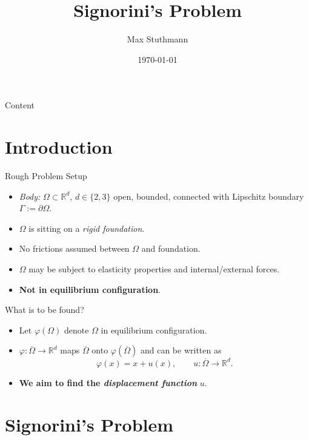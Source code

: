 \documentclass[10pt,aspectratio=169]{beamer}
\title{Signorini's Problem}
\author{Max Stuthmann}
\date{\tiny \today}
\def\R{{\mathbb R}}
\begin{document}
\begin{frame}[plain]
	\titlepage
\end{frame}

\begin{frame}{Content}
	\tableofcontents
\end{frame}

\section{Introduction}
\begin{frame}{Rough Problem Setup}
	\begin{itemize}
		\item {\em Body: } $\Omega\subset\R^d,\, d\in\{2,3\}$ open, bounded, connected with Lipschitz boundary $\Gamma:= \partial\Omega$.
		\item $\Omega$ is sitting on a {\em rigid foundation}.
		\item No frictions assumed between $\Omega$ and foundation.
		\item $\Omega$ may be subject to elasticity properties and internal/external forces.
		\item {\bf Not in equilibrium configuration}.
	\end{itemize}
	\begin{figure}[!h]
		\centering
		
	\end{figure}
\end{frame}

\begin{frame}{What is to be found?}
	\begin{itemize}
		\item Let $\varphi(\Omega)$ denote $\Omega$ in equilibrium configuration.
		\item $\varphi:\overline{\Omega}\to\R^d$ maps $\overline{\Omega}$ onto $\varphi(\overline{\Omega})$ and can be written as
		      \begin{equation*}
			      \varphi(x) = x+ u(x),\qquad u:\overline{\Omega}\to\R^d.
		      \end{equation*}
		\item {\bf We aim to find the {\em displacement function}} $u$.
	\end{itemize}
	\begin{figure}[!h]
		\centering
		
	\end{figure}
\end{frame}

\section{Signorini's Problem}
\end{document}

